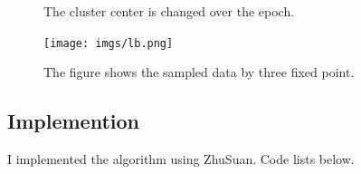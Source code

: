 \documentclass[a4paper]{article}
\begin{document}
\begin{landscape}
\begin{figure}
\caption{The cluster center is changed over the epoch.}
\end{figure}
\end{landscape}


\begin{figure}[!htbp]
\begin{center}
\texttt{[image: imgs/lb.png]}
\end{center}
\caption{The figure shows the sampled data by three fixed point.}\label{datavis}
\end{figure}

\subsection{Implemention}

 I implemented the algorithm using ZhuSuan. Code lists below.\\
\end{document}
